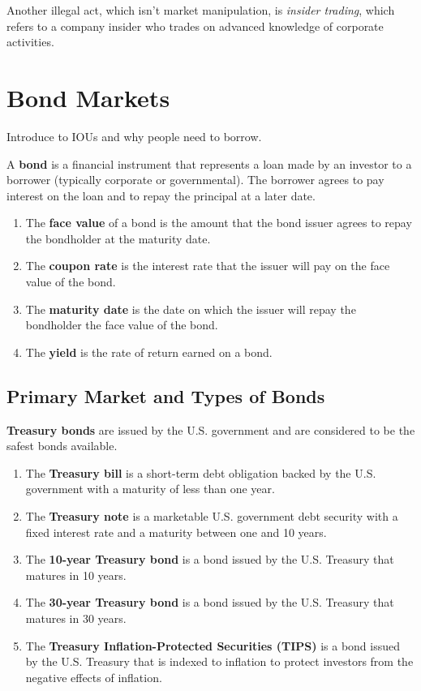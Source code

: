 \documentclass{article}
\begin{document}
    Another illegal act, which isn't market manipulation, is \textit{insider trading}, which refers to a company insider who trades on advanced knowledge of corporate activities. 

\section{Bond Markets}

    Introduce to IOUs and why people need to borrow. 

    \begin{definition}[Bond]
      A \textbf{bond} is a financial instrument that represents a loan made by an investor to a borrower (typically corporate or governmental). The borrower agrees to pay interest on the loan and to repay the principal at a later date. 
      \begin{enumerate}
        \item The \textbf{face value} of a bond is the amount that the bond issuer agrees to repay the bondholder at the maturity date. 
        \item The \textbf{coupon rate} is the interest rate that the issuer will pay on the face value of the bond. 
        \item The \textbf{maturity date} is the date on which the issuer will repay the bondholder the face value of the bond. 
        \item The \textbf{yield} is the rate of return earned on a bond. 
      \end{enumerate}
    \end{definition}

  \subsection{Primary Market and Types of Bonds} 

    \begin{definition}
      \textbf{Treasury bonds} are issued by the U.S. government and are considered to be the safest bonds available. 
      \begin{enumerate}
        \item The \textbf{Treasury bill} is a short-term debt obligation backed by the U.S. government with a maturity of less than one year. 
        \item The \textbf{Treasury note} is a marketable U.S. government debt security with a fixed interest rate and a maturity between one and 10 years.
        \item The \textbf{10-year Treasury bond} is a bond issued by the U.S. Treasury that matures in 10 years. 
        \item The \textbf{30-year Treasury bond} is a bond issued by the U.S. Treasury that matures in 30 years. 
        \item The \textbf{Treasury Inflation-Protected Securities (TIPS)} is a bond issued by the U.S. Treasury that is indexed to inflation to protect investors from the negative effects of inflation. 
      \end{enumerate}
    \end{definition}
\end{document}
